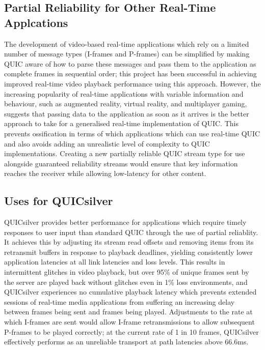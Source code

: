 \documentclass{mpaper}
\begin{document}
\subsection{Partial Reliability for Other Real-Time Applcations}
The development of video-based real-time applications which rely on a limited number of message types (I-frames and P-frames) can be simplified by making QUIC aware of how to parse these messages and pass them to the application as complete frames in sequential order; this project has been successful in achieving improved real-time video playback performance using this approach. However, the increasing popularity of real-time applications with variable information and behaviour, such as augmented reality, virtual reality, and multiplayer gaming, suggests that passing data to the application as soon as it arrives is the better approach to take for a generalised real-time implementation of QUIC. This prevents ossification in terms of which applications which can use real-time QUIC and also avoids adding an unrealistic level of complexity to QUIC implementations. Creating a new partially reliable QUIC stream type for use alongside guaranteed reliability streams would ensure that key information reaches the receiver while allowing low-latency for other content.


\subsection{Uses for QUICsilver}
QUICsilver provides better performance for applications which require timely responses to user input than standard QUIC through the use of partial reliablity. It achieves this by adjusting its stream read offsets and removing items from its retransmit buffers in response to playback deadlines, yielding consistently lower application latencies at all link latencies and loss levels. This results in intermittent glitches in video playback, but over 95\% of unique frames sent by the server are played back without glitches even in 1\% loss environments, and QUICsilver experiences no cumulative playback latency which prevents extended sessions of real-time media applications from suffering an increasing delay between frames being sent and frames being played. Adjustments to the rate at which I-frames are sent would allow I-frame retransmissions to allow subsequent P-frames to be played correctly; at the current rate of 1 in 10 frames, QUICsilver effectively performs as an unreliable transport at path latencies above 66.6ms.
\end{document}
